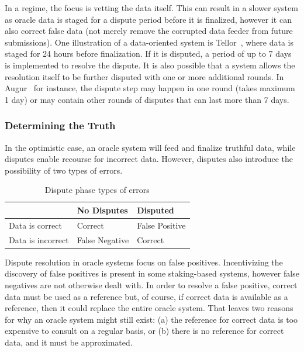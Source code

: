In a  regime, the focus is vetting the data itself. This can result in a slower system as oracle data is staged for a dispute period before it is finalized, however it can also correct false data (not merely remove the corrupted data feeder from future submissions). One illustration of a data-oriented system is Tellor~\cite{tellorWhitepaper,tellordispute}, where data is staged for 24 hours before finalization. If it is disputed, a period of up to 7 days is implemented to resolve the dispute. It is also possible that a system allows the resolution itself to be further disputed with one or more additional rounds. In Augur~\cite{peterson2015augur} for instance, the dispute step may happen in one round (takes maximum 1 day) or may contain other rounds of disputes that can last more than 7 days. 



\subsubsection{Determining the Truth}

In the optimistic case, an oracle system will feed and finalize truthful data, while disputes enable recourse for incorrect data. However, disputes also introduce the possibility of two types of errors.

\begin{table}[h]
	\centering
\begin{tabular}{l|l|l|}
& No Disputes & Disputed \\ \hline
Data is correct & Correct & False Positive \\
Data is incorrect & False Negative & Correct \\
\end{tabular}
\caption[Dispute Phase Types of Errors]{Dispute phase types of errors}
\end{table}

Dispute resolution in oracle systems focus on false positives. Incentivizing the discovery of false positives is present in some staking-based systems, however false negatives are not otherwise dealt with. In order to resolve a false positive, correct data must be used as a reference but, of course, if correct data is available as a reference, then it could replace the entire oracle system. That leaves two reasons for why an oracle system might still exist: (a) the reference for correct data is too expensive to consult on a regular basis, or (b) there is no reference for correct data, and it must be approximated. 


